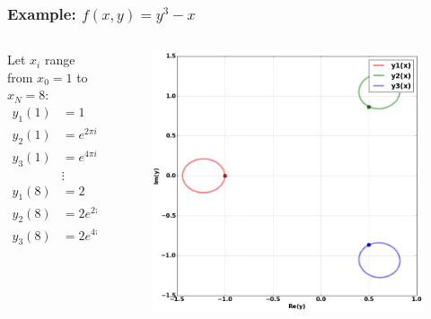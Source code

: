 \documentclass{beamer}
\begin{document}
\begin{frame}
  \frametitle{Example: $f(x,y) = y^3 - x$}
  \begin{columns}
  \begin{column}{0.3\textwidth}
    Let $x_i$ range from $x_0 = 1$ to $x_N = 8$:
    \begin{align*}
    y_1(1)&=1 \\ y_2(1)&=e^{2\pi i/3} \\ y_3(1)&=e^{4\pi i/3} \\ &\vdots \\
    y_1(8)&=2 \\ y_2(8)&=2e^{2\pi i/3} \\ y_3(8)&=2e^{4\pi i/3}
    \end{align*}
  \end{column}

  \begin{column}{0.7\textwidth}
  \begin{figure}
    \centering
    \includegraphics[width=\textwidth]{images/ancontsimple1.png}
  \end{figure}
  \end{column}
  \end{columns}
\end{frame}
\end{document}
